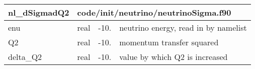 \documentclass{article}
\begin{document}

\begin{longtable}{llll}
\toprule
\textbf{\large{nl\_dSigmadQ2}} & \multicolumn{3}{l}{\footnotesize{code/init/neutrino/neutrinoSigma.f90}}\\*
\midrule
\endfirsthead
\midrule
\endhead
enu & \begin{minipage}[t]{2cm}real\end{minipage} & \begin{minipage}[t]{2cm}-10.\end{minipage} & \begin{minipage}[t]{12cm}neutrino energy, read in by namelist\end{minipage}\\*
\midrule
Q2 & \begin{minipage}[t]{2cm}real\end{minipage} & \begin{minipage}[t]{2cm}-10.\end{minipage} & \begin{minipage}[t]{12cm}momentum transfer squared\end{minipage}\\*
\midrule
delta\_Q2 & \begin{minipage}[t]{2cm}real\end{minipage} & \begin{minipage}[t]{2cm}-10.\end{minipage} & \begin{minipage}[t]{12cm}value by which Q2 is increased\end{minipage}\\*
\bottomrule
\end{longtable}
{ }



\end{document}
